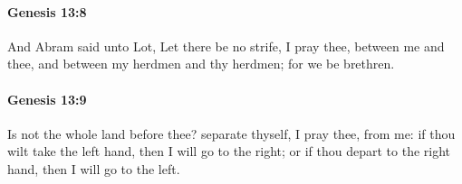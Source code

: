 		\paragraph{Genesis 13:8} %
			\label{GENESIS-13-8}

			And Abram said unto Lot, Let there be no strife, I pray thee, between me and thee, and between my herdmen and thy herdmen; for we be brethren.


		\paragraph{Genesis 13:9} %
			\label{GENESIS-13-9}

			Is not the whole land before thee? separate thyself, I pray thee, from me: if thou wilt take the left hand, then I will go to the right; or if thou depart to the right hand, then I will go to the left.



